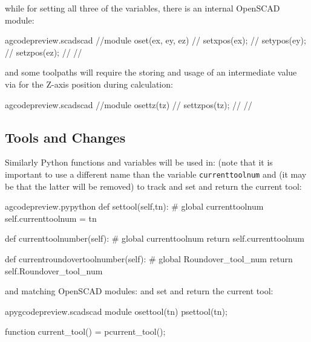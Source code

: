 \documentclass{ltxdoc}
\begin{document}
\noindent{} while for setting all three of the variables, there is an internal OpenSCAD module:

\lstset{firstnumber=\thegcpscad}
\begin{writecode}{a}{gcodepreview.scad}{scad}
//module oset(ex, ey, ez) {
//    setxpos(ex);
//    setypos(ey);
//    setzpos(ez);
//}
//
\end{writecode}
\addtocounter{gcpscad}{6}
 
\noindent and some toolpaths will require the storing and usage of an intermediate value via  for the Z-axis position during calculation:

\lstset{firstnumber=\thegcpscad}
\begin{writecode}{a}{gcodepreview.scad}{scad}
//module osettz(tz) {
//    settzpos(tz);
//}
//
\end{writecode}
\addtocounter{gcpscad}{4}

\subsection{Tools and Changes}
 
Similarly Python functions and variables will be used in:  (note that it is important to use a different name than the variable \verb|currenttoolnum| and  (it may be that the latter will be removed) to track and set and return the current tool:
 
\lstset{firstnumber=\thegcpy}
\begin{writecode}{a}{gcodepreview.py}{python}
    def settool(self,tn):
#        global currenttoolnum
        self.currenttoolnum = tn

    def currenttoolnumber(self):
#        global currenttoolnum
        return self.currenttoolnum

    def currentroundovertoolnumber(self):
#        global Roundover_tool_num
        return self.Roundover_tool_num

\end{writecode}
\addtocounter{gcpy}{12}
 
\noindent and matching OpenSCAD modules:
 and
set and return the current tool: 
  
\lstset{firstnumber=\thepyscad}
\begin{writecode}{a}{pygcodepreview.scad}{scad}
module osettool(tn){
    psettool(tn);
}

function current_tool() = pcurrent_tool();

\end{writecode}
\addtocounter{pyscad}{6}
\end{document}
